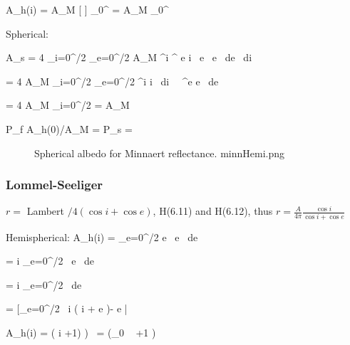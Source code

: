 \qb A_h(i) =  A_M  [ ] \mu_0^{\nu}  
=  A_M  \mu_0^{}  \qe

Spherical:

\qb A_s = 4 \pi  \int_{i=0}^{\pi/2}  \int_{e=0}^{\pi/2}  A_M \cos^\nu i  \cos^{} e \cdot \sin i \ \cos e \ \sin e \ de \ di  \qe

\qb = 4 \pi  A_M  \int_{i=0}^{\pi/2} \int_{e=0}^{\pi/2} \cos^\nu i \sin i \ di \ \ \cos^\nu e  \sin e \ de  \qe

\qb = 4 \pi  A_M  \int_{i=0}^{\pi/2} \left[_{e=0}^{\pi/2} \ - \frac{\cos^{\nu+1}e}{\nu+1} \right| \ \cos^\nu i  \sin i \ di  \qe

\qb = 4 \pi  A_M   \left[ \frac{1}{\nu+1} \right]  \left[_{i=0}^{\pi/2} \ - \frac{\cos^{\nu+1} i}{\nu+1} \right| \qe

\qb = 4 \pi  A_M   \left[ \frac{1}{\nu+1} \right]  [\frac{1}{\nu+1}] = A_M  \qe

\qbn P_f \equiv A_h(0)/A_M  =  \mc{;}  P_s  \equiv {}=  

\begin{figure}[!ht] 
\caption [Minnaert $A_s$]{Spherical albedo for Minnaert reflectance.
\label{minnHemi}  minnHemi.png }
\end{figure} 

\subsubsection{Lommel-Seeliger} 

 $r= $ Lambert $/ 4(\cos i + \cos e) $, H(6.11) and H(6.12), 
thus $r= \frac{A}{4 \pi} \frac{\cos i}{\cos i+ \cos e} $

Hemispherical:
\qb A_h(i) =  \int_{e=0}^{\pi/2}    \cdot  \cos e \ \sin e \ de \qe

\qb  =   \cos i \int_{e=0}^{\pi/2}  \ \sin e \ de \qe

\qbn  =  \cos i \int_{e=0}^{\pi/2}  \ de 

\qb  =  \left[_{e=0}^{\pi/2} \  \cos i \ln ( \cos i + \cos e )- \cos e  \right| \qe

\qbn A_h(i) =  \left( \cos i \ln{} +1) \right)  
 \ =  \left(\mu_0 \ \ln {} +1 \right) 

